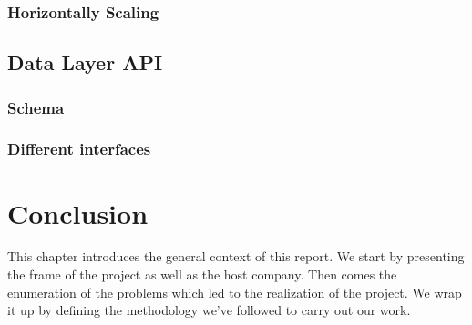 \subsubsection{Horizontally Scaling}
\subsection{Data Layer API}
\subsubsection{Schema}
\subsubsection{Different interfaces}

\newpage
\setcounter{secnumdepth}{0} %
\section{Conclusion}
This chapter introduces the general context of this report. We start by presenting the frame of the project as well as the host company. Then comes the enumeration of the problems which led to the realization of the project. We wrap it up by defining the methodology we’ve followed to carry out our work.
